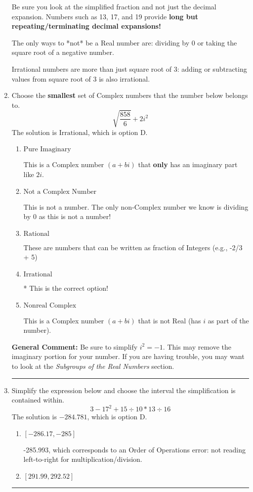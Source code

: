 \documentclass{extbook}[14pt]
\newcommand{\litem}[1]{\item #1

\rule{\textwidth}{0.4pt}}
\begin{document}
\begin{enumerate}
{ Be sure you look at the simplified fraction and not just the decimal expansion. Numbers such as 13, 17, and 19 provide \textbf{long but repeating/terminating decimal expansions!} 
 
 The only ways to *not* be a Real number are: dividing by 0 or taking the square root of a negative number. 
 
 Irrational numbers are more than just square root of 3: adding or subtracting values from square root of 3 is also irrational.
}
\litem{
Choose the \textbf{smallest} set of Complex numbers that the number below belongs to.
\[ \sqrt{\frac{858}{6}}+2i^2 \]The solution is \( \text{Irrational} \), which is option D.\begin{enumerate}[label=\Alph*.]
\item \( \text{Pure Imaginary} \)

This is a Complex number $(a+bi)$ that \textbf{only} has an imaginary part like $2i$.
\item \( \text{Not a Complex Number} \)

This is not a number. The only non-Complex number we know is dividing by 0 as this is not a number!
\item \( \text{Rational} \)

These are numbers that can be written as fraction of Integers (e.g., -2/3 + 5)
\item \( \text{Irrational} \)

* This is the correct option!
\item \( \text{Nonreal Complex} \)

This is a Complex number $(a+bi)$ that is not Real (has $i$ as part of the number).
\end{enumerate}

\textbf{General Comment:} Be sure to simplify $i^2 = -1$. This may remove the imaginary portion for your number. If you are having trouble, you may want to look at the \textit{Subgroups of the Real Numbers} section.
}
\litem{
Simplify the expression below and choose the interval the simplification is contained within.
\[ 3 - 17^2 + 15 \div 10 * 13 \div 16 \]The solution is \( -284.781 \), which is option D.\begin{enumerate}[label=\Alph*.]
\item \( [-286.17, -285] \)

 -285.993, which corresponds to an Order of Operations error: not reading left-to-right for multiplication/division.
\item \( [291.99, 292.52] \)


\end{enumerate}}
\end{enumerate}
\end{document}
